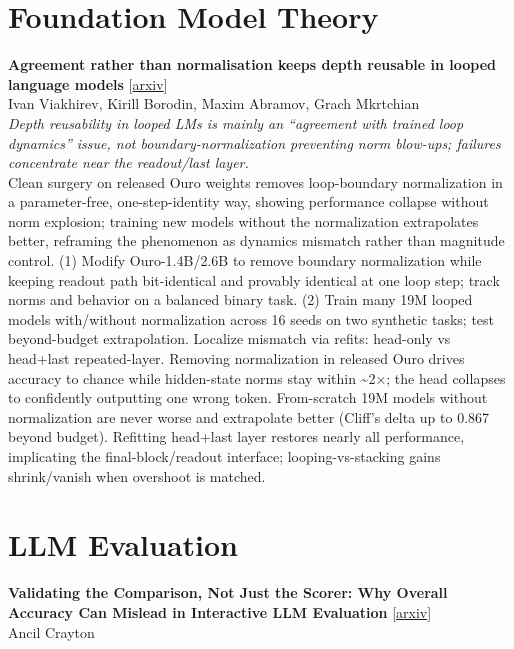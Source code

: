 \documentclass[12pt,letterpaper]{article}
\begin{document}
\medskip


\section*{Foundation Model Theory}

{\small\textbf{Agreement rather than normalisation keeps depth reusable in looped language models}} {\scriptsize[\href{https://arxiv.org/abs/2610.31943}{arxiv}]}\\
{\scriptsize Ivan Viakhirev, Kirill Borodin, Maxim Abramov, Grach Mkrtchian}\\

{\small\textit{Depth reusability in looped LMs is mainly an ``agreement with trained loop dynamics'' issue, not boundary-normalization preventing norm blow-ups; failures concentrate near the readout/last layer.}}\\[1pt]
{\footnotesize Clean surgery on released Ouro weights removes loop-boundary normalization in a parameter-free, one-step-identity way, showing performance collapse without norm explosion; training new models without the normalization extrapolates better, reframing the phenomenon as dynamics mismatch rather than magnitude control. (1) Modify Ouro-1.4B/2.6B to remove boundary normalization while keeping readout path bit-identical and provably identical at one loop step; track norms and behavior on a balanced binary task. (2) Train many 19M looped models with/without normalization across 16 seeds on two synthetic tasks; test beyond-budget extrapolation. Localize mismatch via refits: head-only vs head+last repeated-layer. Removing normalization in released Ouro drives accuracy to chance while hidden-state norms stay within \textasciitilde{}2×; the head collapses to confidently outputting one wrong token. From-scratch 19M models without normalization are never worse and extrapolate better (Cliff's delta up to 0.867 beyond budget). Refitting head+last layer restores nearly all performance, implicating the final-block/readout interface; looping-vs-stacking gains shrink/vanish when overshoot is matched.}

\medskip


\section*{LLM Evaluation}

{\small\textbf{Validating the Comparison, Not Just the Scorer: Why Overall Accuracy Can Mislead in Interactive LLM Evaluation}} {\scriptsize[\href{https://arxiv.org/abs/2610.31678}{arxiv}]}\\
{\scriptsize Ancil Crayton}\\
\end{document}

